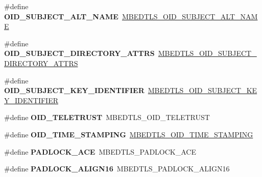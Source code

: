 \begin{DoxyCompactItemize}
\#define {\bfseries O\+I\+D\+\_\+\+S\+U\+B\+J\+E\+C\+T\+\_\+\+A\+L\+T\+\_\+\+N\+A\+ME}~\mbox{\hyperlink{oid_8h_a03c23655749d213fb26e608d7d0b952c}{M\+B\+E\+D\+T\+L\+S\+\_\+\+O\+I\+D\+\_\+\+S\+U\+B\+J\+E\+C\+T\+\_\+\+A\+L\+T\+\_\+\+N\+A\+ME}}
\item 
\mbox{\label{compat-1_83_8h_af25a030a9cd161912e58b50287da25ea}} 
\#define {\bfseries O\+I\+D\+\_\+\+S\+U\+B\+J\+E\+C\+T\+\_\+\+D\+I\+R\+E\+C\+T\+O\+R\+Y\+\_\+\+A\+T\+T\+RS}~\mbox{\hyperlink{oid_8h_a1bc877b377f188063914019663920ce4}{M\+B\+E\+D\+T\+L\+S\+\_\+\+O\+I\+D\+\_\+\+S\+U\+B\+J\+E\+C\+T\+\_\+\+D\+I\+R\+E\+C\+T\+O\+R\+Y\+\_\+\+A\+T\+T\+RS}}
\item 
\mbox{\label{compat-1_83_8h_a2f5bd13e656c8ce94e03f2ed0f102355}} 
\#define {\bfseries O\+I\+D\+\_\+\+S\+U\+B\+J\+E\+C\+T\+\_\+\+K\+E\+Y\+\_\+\+I\+D\+E\+N\+T\+I\+F\+I\+ER}~\mbox{\hyperlink{oid_8h_a698cce56e06194d62bf49201e44dc5d8}{M\+B\+E\+D\+T\+L\+S\+\_\+\+O\+I\+D\+\_\+\+S\+U\+B\+J\+E\+C\+T\+\_\+\+K\+E\+Y\+\_\+\+I\+D\+E\+N\+T\+I\+F\+I\+ER}}
\item 
\mbox{\label{compat-1_83_8h_a0cd5084a00692c7f2e5e07bc165c82dc}} 
\#define {\bfseries O\+I\+D\+\_\+\+T\+E\+L\+E\+T\+R\+U\+ST}~M\+B\+E\+D\+T\+L\+S\+\_\+\+O\+I\+D\+\_\+\+T\+E\+L\+E\+T\+R\+U\+ST
\item 
\mbox{\label{compat-1_83_8h_a40f5cf7dced28c57cd3b699255a57493}} 
\#define {\bfseries O\+I\+D\+\_\+\+T\+I\+M\+E\+\_\+\+S\+T\+A\+M\+P\+I\+NG}~\mbox{\hyperlink{oid_8h_aa4758a9869e5160037e4a1f9327738ed}{M\+B\+E\+D\+T\+L\+S\+\_\+\+O\+I\+D\+\_\+\+T\+I\+M\+E\+\_\+\+S\+T\+A\+M\+P\+I\+NG}}
\item 
\mbox{\label{compat-1_83_8h_ad86fbf3f26cdf77a953d43eb379db66c}} 
\#define {\bfseries P\+A\+D\+L\+O\+C\+K\+\_\+\+A\+CE}~M\+B\+E\+D\+T\+L\+S\+\_\+\+P\+A\+D\+L\+O\+C\+K\+\_\+\+A\+CE
\item 
\mbox{\label{compat-1_83_8h_a52b6ff733d6d9b29dcb62d805026cb7f}} 
\#define {\bfseries P\+A\+D\+L\+O\+C\+K\+\_\+\+A\+L\+I\+G\+N16}~M\+B\+E\+D\+T\+L\+S\+\_\+\+P\+A\+D\+L\+O\+C\+K\+\_\+\+A\+L\+I\+G\+N16
\item 
\mbox{\label{compat-1_83_8h_aa4857031bf1a0df4f2c8ec160ed7532f}} 

\end{DoxyCompactItemize}
